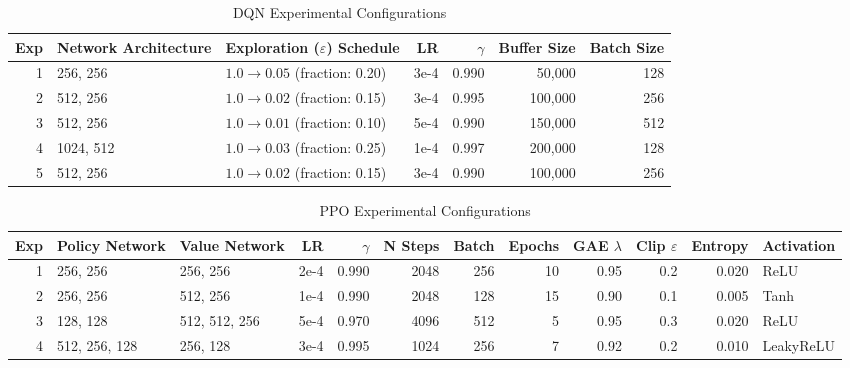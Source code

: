 \documentclass{article}
\begin{document}
\begin{table}[t]
\centering
\begin{tabular}{rllrrrr}
\toprule
\textbf{Exp} & \textbf{Network Architecture} & \textbf{Exploration ($\varepsilon$) Schedule} & \textbf{LR} & \textbf{$\gamma$} & \textbf{Buffer Size} & \textbf{Batch Size} \\
\midrule
1 & 256, 256   & $1.0 \to 0.05$ (fraction: 0.20) & 3e-4 & 0.990 & 50,000  & 128 \\
2 & 512, 256   & $1.0 \to 0.02$ (fraction: 0.15) & 3e-4 & 0.995 & 100,000 & 256 \\
3 & 512, 256   & $1.0 \to 0.01$ (fraction: 0.10) & 5e-4 & 0.990 & 150,000 & 512 \\
4 & 1024, 512  & $1.0 \to 0.03$ (fraction: 0.25) & 1e-4 & 0.997 & 200,000 & 128 \\
5 & 512, 256   & $1.0 \to 0.02$ (fraction: 0.15) & 3e-4 & 0.990 & 100,000 & 256 \\
\bottomrule
\end{tabular}
\caption{DQN Experimental Configurations}
\label{tab:dqn_config}
\end{table}

\begin{table}[t]
\centering
\begin{tabular}{rllrrrrrrrrl}
\toprule
\textbf{Exp} & \textbf{Policy Network} & \textbf{Value Network} & \textbf{LR} & \textbf{$\gamma$} & \textbf{N Steps} & \textbf{Batch} & \textbf{Epochs} & \textbf{GAE $\lambda$} & \textbf{Clip $\varepsilon$} & \textbf{Entropy} & \textbf{Activation} \\
\midrule
1 & 256, 256      & 256, 256      & 2e-4 & 0.990 & 2048 & 256 & 10 & 0.95 & 0.2 & 0.020 & ReLU      \\
2 & 256, 256      & 512, 256      & 1e-4 & 0.990 & 2048 & 128 & 15 & 0.90 & 0.1 & 0.005 & Tanh      \\
3 & 128, 128      & 512, 512, 256 & 5e-4 & 0.970 & 4096 & 512 &  5 & 0.95 & 0.3 & 0.020 & ReLU      \\
4 & 512, 256, 128 & 256, 128      & 3e-4 & 0.995 & 1024 & 256 &  7 & 0.92 & 0.2 & 0.010 & LeakyReLU \\
\bottomrule
\end{tabular}
\caption{PPO Experimental Configurations}
\label{tab:ppo_config}
\end{table}
\end{document}
